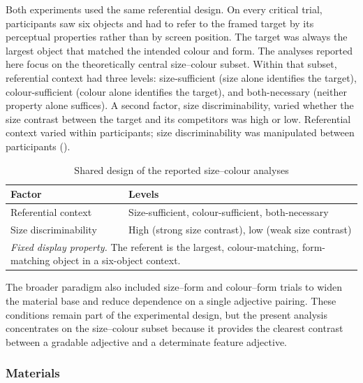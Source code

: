 \documentclass[man,floatsintext]{apa7}
\begin{document}
Both experiments used the same referential design.
On every critical trial, participants saw six objects and had to refer to the framed target by its perceptual properties rather than by screen position.
The target was always the largest object that matched the intended colour and form.
The analyses reported here focus on the theoretically central size--colour subset.
Within that subset, referential context had three levels: size-sufficient (size alone identifies the target), colour-sufficient (colour alone identifies the target), and both-necessary (neither property alone suffices).
A second factor, size discriminability, varied whether the size contrast between the target and its competitors was high or low.
Referential context varied within participants; size discriminability was manipulated between participants ().

\begin{table}[htbp]
  \caption{Shared design of the reported size--colour analyses}
  \label{tab:design}
  \centering
  \begin{tabularx}{0.88\textwidth}{lX}
    \toprule
    \textbf{Factor} & \textbf{Levels} \\
    \midrule
    Referential context & Size-sufficient, colour-sufficient, both-necessary \\
    Size discriminability & High (strong size contrast), low (weak size contrast) \\
    \midrule
    \multicolumn{2}{p{0.84\textwidth}}{\textit{Fixed display property.} The referent is the largest, colour-matching, form-matching object in a six-object context.} \\
    \bottomrule
  \end{tabularx}
\end{table}

The broader paradigm also included size--form and colour--form trials to widen the material base and reduce dependence on a single adjective pairing.
These conditions remain part of the experimental design, but the present analysis concentrates on the size--colour subset because it provides the clearest contrast between a gradable adjective and a determinate feature adjective.

\subsubsection{Materials}
\end{document}
